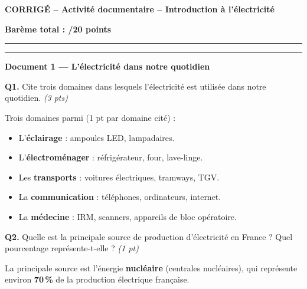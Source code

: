 \documentclass[11pt,a4paper]{article}
\begin{document}
\begin{center}
  {\LARGE\textbf{CORRIGÉ -- Activité documentaire -- Introduction à l'électricité}}

  \vspace{3mm}

  {\large\textbf{Barème total : /20 points}}
\end{center}

\hrule
\vspace{3mm}
\hrule
\vspace{5mm}

\textbf{Document 1 --- L'électricité dans notre quotidien}

\vspace{3mm}

\textbf{Q1.} Cite trois domaines dans lesquels l'électricité est utilisée dans notre quotidien. \hfill \textit{(3 pts)}

\begin{tcolorbox}[colback=green!5!white,colframe=green!75!black]
Trois domaines parmi (1 pt par domaine cité) :
\begin{itemize}
  \item L'\textbf{éclairage} : ampoules LED, lampadaires.
  \item L'\textbf{électroménager} : réfrigérateur, four, lave-linge.
  \item Les \textbf{transports} : voitures électriques, tramways, TGV.
  \item La \textbf{communication} : téléphones, ordinateurs, internet.
  \item La \textbf{médecine} : IRM, scanners, appareils de bloc opératoire.
\end{itemize}
\end{tcolorbox}

\vspace{3mm}

\textbf{Q2.} Quelle est la principale source de production d'électricité en France ? Quel pourcentage représente-t-elle ? \hfill \textit{(1 pt)}

\begin{tcolorbox}[colback=green!5!white,colframe=green!75!black]
La principale source est l'énergie \textbf{nucléaire} (centrales nucléaires), qui représente environ \textbf{70\,\%} de la production électrique française.
\end{tcolorbox}
\end{document}
